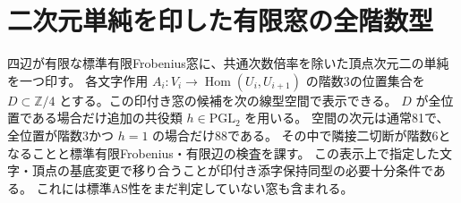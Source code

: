 \section{二次元単純を印した有限窓の全階数型}
\label{sec:two-dimensional-marked-tensor-forms}
\begin{theorem}\label{thm:two-dimensional-marked-tensor-forms}
四辺が有限な標準有限Frobenius窓に、共通次数倍率を除いた頂点次元二の単純を一つ印す。
各文字作用 $A_i:V_i\to\operatorname{Hom}(U_i,U_{i+1})$ の階数3の位置集合を
$D\subset\mathbb Z/4$ とする。この印付き窓の候補を次の線型空間で表示できる。
$D$ が全位置である場合だけ追加の共役類 $h\in\mathrm{PGL}_2$ を用いる。
空間の次元は通常81で、全位置が階数3かつ $h=1$ の場合だけ88である。
その中で隣接二切断が階数6となることと標準有限Frobenius・有限辺の検査を課す。
この表示上で指定した文字・頂点の基底変更で移り合うことが印付き添字保持同型の必要十分条件である。
これには標準AS性をまだ判定していない窓も含まれる。
\end{theorem}
